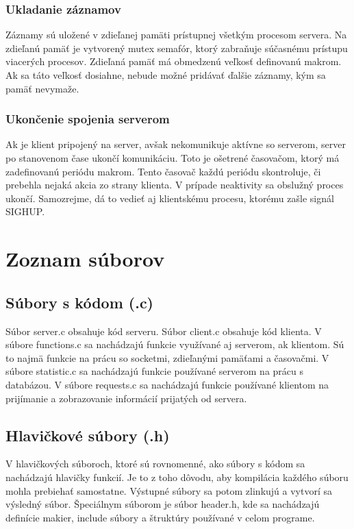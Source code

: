 \documentclass{article}
\begin{document}
\subsubsection{Ukladanie záznamov}
Záznamy sú uložené v zdieľanej pamäti prístupnej všetkým procesom servera. Na zdieľanú pamäť je 
vytvorený mutex semafór, ktorý zabraňuje súčasnému prístupu viacerých procesov. Zdieľaná pamäť má
obmedzenú veľkosť definovanú makrom. Ak sa táto veľkosť dosiahne, nebude možné pridávať ďalšie záznamy, 
kým sa pamäť nevymaže.
\subsubsection{Ukončenie spojenia serverom}
Ak je klient pripojený na server, avšak nekomunikuje aktívne so serverom, server po stanovenom čase
ukončí komunikáciu. Toto je ošetrené časovačom, ktorý má zadefinovanú periódu makrom. Tento časovač
každú periódu skontroluje, či prebehla nejaká akcia zo strany klienta. V prípade neaktivity sa obslužný 
proces ukončí. Samozrejme, dá to vedieť aj klientskému procesu, ktorému zašle signál SIGHUP.


\section{Zoznam súborov}
\subsection{Súbory s kódom (.c)}
Súbor server.c obsahuje kód serveru.
\newline
Súbor client.c obsahuje kód klienta.
\newline
V súbore functions.c sa nachádzajú funkcie využívané aj serverom, ak klientom. Sú to najmä funkcie na
prácu so socketmi, zdieľanými pamäťami a časovačmi.
\newline
V súbore statistic.c sa nachádzajú funkcie používané serverom na prácu s databázou. 
\newline
V súbore requests.c sa nachádzajú funkcie používané klientom na prijímanie a zobrazovanie informácií prijatých od servera.
\subsection{Hlavičkové súbory (.h)}
V hlavičkových súboroch, ktoré sú rovnomenné, ako súbory s kódom sa nachádzajú hlavičky funkcií. Je
to z toho dôvodu, aby kompilácia každého súboru mohla prebiehať samostatne. Výstupné súbory sa
potom zlinkujú a vytvorí sa výsledný súbor. 
\newline
Špeciálnym súborom je súbor header.h, kde sa nachádzajú definície makier, include súbory a štruktúry
používané v celom programe.
\end{document}
